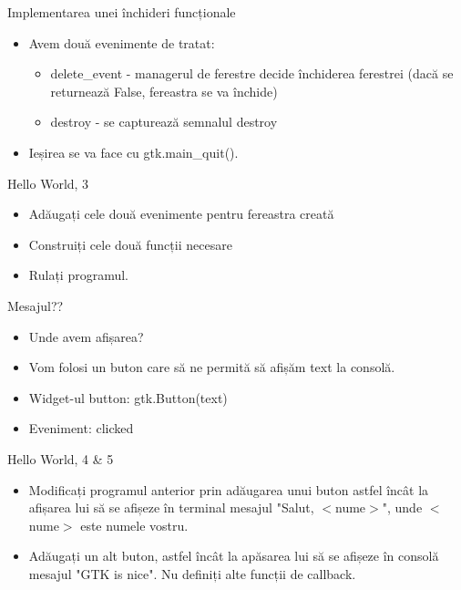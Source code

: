 \documentclass{beamer}
\begin{document}
\begin{frame}{Implementarea unei închideri funcționale}
\begin{itemize}
	\item Avem două evenimente de tratat:
		\begin{itemize}
			\item delete\_event - managerul de ferestre decide închiderea ferestrei (dacă se returnează False, fereastra se va închide)
			\item destroy - se capturează semnalul destroy
		\end{itemize}
	\item \pause Ieșirea se va face cu gtk.main\_quit().
\end{itemize}
\end{frame}

\begin{frame}{Hello World, 3}
\begin{itemize}
	\item Adăugați cele două evenimente pentru fereastra creată
	\item Construiți cele două funcții necesare
	\item Rulați programul.
\end{itemize}
\end{frame}

\begin{frame}{Mesajul??}
\begin{itemize}
	\item Unde avem afișarea?
	\item Vom folosi un buton care să ne permită să afișăm text la consolă.
	\item Widget-ul button: gtk.Button(text)
	\item Eveniment: clicked
\end{itemize}
\end{frame}

\begin{frame}{Hello World, 4 \& 5}
\begin{itemize}
	\item Modificați programul anterior prin adăugarea unui buton astfel încât la afișarea lui să se afișeze în terminal mesajul "Salut, $<$nume$>$", unde $<$nume$>$ este numele vostru.
	\item \pause Adăugați un alt buton, astfel încât la apăsarea lui să se afișeze în consolă mesajul "GTK is nice". Nu definiți alte funcții de callback.
\end{itemize}
\end{frame}
\end{document}
